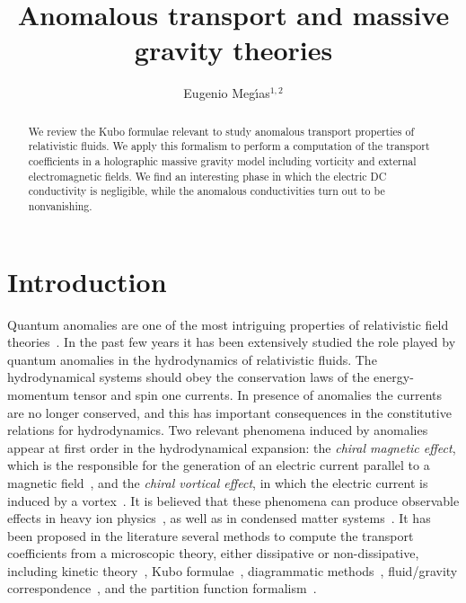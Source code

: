 \documentclass[a4paper]{jpconf}
\begin{document}
\title{Anomalous transport and massive gravity theories}

\author{Eugenio Meg\'{\i}as$^{1,2}$}
 
\address{$^{1}$Max-Planck-Institut f\"ur Physik (Werner-Heisenberg-Institut), F\"ohringer Ring 6, D-80805, Munich, Germany}
\address{$^{2}$Departamento de F\'{\i}sica Te\'orica, Universidad del Pa\'{\i}s Vasco UPV/EHU, Apartado 644,  48080 Bilbao, Spain}


\begin{abstract}
We review the Kubo formulae relevant to study anomalous transport properties of relativistic fluids. We apply this formalism to perform a computation of the transport coefficients in a holographic massive gravity model including vorticity and external electromagnetic fields. We find an interesting phase in which the electric DC conductivity is negligible, while the anomalous conductivities turn out to be nonvanishing.
\end{abstract}



\section{Introduction}
\label{sec:intro}

Quantum anomalies are one of the most intriguing properties of relativistic field theories~\cite{Bertlmann:1996xk}. In the past few years it has been extensively studied the role played by quantum anomalies in the hydrodynamics of relativistic fluids. The hydrodynamical systems should obey the conservation laws of the energy-momentum tensor and spin one currents. In presence of anomalies the currents are no longer conserved, and this has important consequences in the constitutive relations for hydrodynamics. Two relevant phenomena induced by anomalies appear at first order in the hydrodynamical expansion: the {\it chiral magnetic effect}, which is the responsible for the generation of an electric current parallel to a magnetic field~\cite{Fukushima:2008xe}, and the {\it chiral vortical effect}, in which the electric current is induced by a vortex~\cite{Son:2009tf}. It is believed that these phenomena can produce observable effects in heavy ion physics~\cite{KerenZur:2010zw}, as well as in condensed matter systems~\cite{Basar:2013iaa}. It has been proposed in the literature several methods to compute the transport coefficients from a microscopic theory, either dissipative or non-dissipative, including kinetic theory~\cite{Arnold:2000dr}, Kubo formulae~\cite{Amado:2011zx,Landsteiner:2012kd,Chowdhury:2015pba}, diagrammatic methods~\cite{Manes:2012hf}, fluid/gravity correspondence~\cite{Bhattacharyya:2008jc,Erdmenger:2008rm,Banerjee:2008th}, and the partition function formalism~\cite{Banerjee:2012iz,Jensen:2012jy,Jensen:2012jh,Megias:2014mba}.
\end{document}
